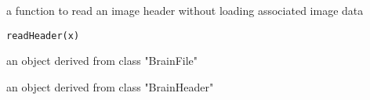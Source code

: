 \begin{Description}\relax
a function to read an image header without loading associated image data
\end{Description}
\begin{Usage}
\begin{verbatim}
readHeader(x)
\end{verbatim}
\end{Usage}
\begin{Arguments}
\begin{ldescription}
\item[\code{x}] an object derived from class "BrainFile" 
\end{ldescription}
\end{Arguments}
\begin{Value}
an object derived from class "BrainHeader"
\end{Value}

